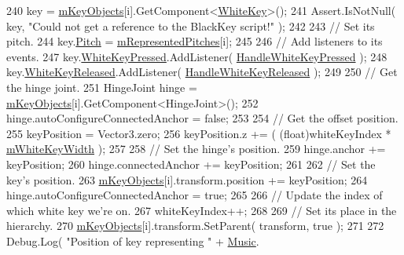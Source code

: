 \begin{DoxyCode}
240                 key = \hyperlink{group___key_contain_priv_var_ga01addf187bb12ffe824374df98e2c2d8}{mKeyObjects}[i].GetComponent<\hyperlink{class_white_key}{WhiteKey}>();
241                 Assert.IsNotNull( key, \textcolor{stringliteral}{"Could not get a reference to the BlackKey script!"} );
242 
243                 \textcolor{comment}{// Set its pitch.}
244                 key.\hyperlink{group___white_key_pub_var_ga1ddd98b85ba069defc7cf47d25f625f4}{Pitch} = \hyperlink{group___key_contain_priv_var_ga103945a6efe3469191e5253d13fec5be}{mRepresentedPitches}[i];
245 
246                 \textcolor{comment}{// Add listeners to its events.}
247                 key.\hyperlink{group___white_key_events_gab84691fc1e9f7b62884589d1813433e2}{WhiteKeyPressed}.AddListener( 
      \hyperlink{group___key_contain_handlers_ga4e2c5e8be389a7514429910e7d61f028}{HandleWhiteKeyPressed} );
248                 key.\hyperlink{group___white_key_events_ga180e88cd7ab95af43231f53469e87830}{WhiteKeyReleased}.AddListener( 
      \hyperlink{group___key_contain_handlers_ga5b98b0105300225fd79638525ad3cb3c}{HandleWhiteKeyReleased} );
249 
250                 \textcolor{comment}{// Get the hinge joint.}
251                 HingeJoint hinge = \hyperlink{group___key_contain_priv_var_ga01addf187bb12ffe824374df98e2c2d8}{mKeyObjects}[i].GetComponent<HingeJoint>();
252                 hinge.autoConfigureConnectedAnchor = \textcolor{keyword}{false};
253 
254                 \textcolor{comment}{// Get the offset position.}
255                 keyPosition = Vector3.zero;
256                 keyPosition.z += ( (float)whiteKeyIndex * \hyperlink{group___key_contain_priv_var_gae5b8787a5242834f99ad8072e7ea6004}{mWhiteKeyWidth} );
257 
258                 \textcolor{comment}{// Set the hinge's position.}
259                 hinge.anchor += keyPosition;
260                 hinge.connectedAnchor += keyPosition;
261 
262                 \textcolor{comment}{// Set the key's position.}
263                 \hyperlink{group___key_contain_priv_var_ga01addf187bb12ffe824374df98e2c2d8}{mKeyObjects}[i].transform.position += keyPosition;
264                 hinge.autoConfigureConnectedAnchor = \textcolor{keyword}{true};
265 
266                 \textcolor{comment}{// Update the index of which white key we're on.}
267                 whiteKeyIndex++;
268 
269                 \textcolor{comment}{// Set its place in the hierarchy.}
270                 \hyperlink{group___key_contain_priv_var_ga01addf187bb12ffe824374df98e2c2d8}{mKeyObjects}[i].transform.SetParent( transform, \textcolor{keyword}{true} ); 
271 
272                 Debug.Log( \textcolor{stringliteral}{"Position of key representing "} + \hyperlink{class_music}{Music}.

\end{DoxyCode}
